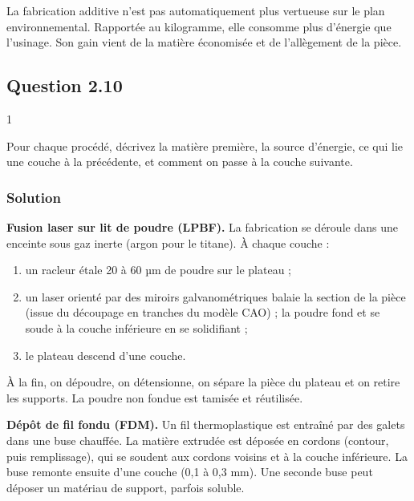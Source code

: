 \documentclass[11pt,a4paper]{article}
\providecommand{\tightlist}{\setlength{\itemsep}{0pt}\setlength{\parskip}{0pt}}
\begin{document}
\begin{piege}

La fabrication additive n'est pas automatiquement plus vertueuse sur le plan environnemental. Rapportée au kilogramme, elle consomme plus d'énergie que l'usinage. Son gain vient de la matière économisée et de l'allègement de la pièce.

\end{piege}

\hypertarget{question-2.10}{%
\subsection{Question 2.10}\label{question-2.10}}

\begin{indication}{1}

Pour chaque procédé, décrivez la matière première, la source d'énergie, ce qui lie une couche à la précédente, et comment on passe à la couche suivante.

\end{indication}

\hypertarget{solution-23}{%
\subsubsection{Solution}\label{solution-23}}

\textbf{Fusion laser sur lit de poudre (LPBF).} La fabrication se déroule dans une enceinte sous gaz inerte (argon pour le titane). À chaque couche :

\begin{enumerate}
\def\labelenumi{\arabic{enumi}.}
\tightlist
\item
  un racleur étale 20 à 60 µm de poudre sur le plateau ;
\item
  un laser orienté par des miroirs galvanométriques balaie la section de la pièce (issue du découpage en tranches du modèle CAO) ; la poudre fond et se soude à la couche inférieure en se solidifiant ;
\item
  le plateau descend d'une couche.
\end{enumerate}

À la fin, on dépoudre, on détensionne, on sépare la pièce du plateau et on retire les supports. La poudre non fondue est tamisée et réutilisée.

\textbf{Dépôt de fil fondu (FDM).} Un fil thermoplastique est entraîné par des galets dans une buse chauffée. La matière extrudée est déposée en cordons (contour, puis remplissage), qui se soudent aux cordons voisins et à la couche inférieure. La buse remonte ensuite d'une couche (0,1 à 0,3 mm). Une seconde buse peut déposer un matériau de support, parfois soluble.
\end{document}
